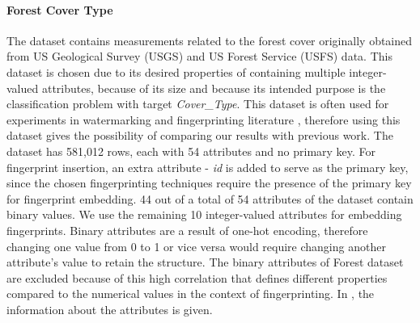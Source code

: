\paragraph{Forest Cover Type}
The dataset contains measurements related to the forest cover originally obtained from US Geological Survey (USGS) and US Forest Service (USFS) data.
This dataset is chosen due to its desired properties of containing multiple integer-valued attributes, because of its size and because its intended purpose is the classification problem with target \textit{Cover\_Type}. 
This dataset is often used for experiments in watermarking and fingerprinting literature \cite{agrawal2003watermarking,li2005fingerprinting}, therefore using this dataset gives the possibility of comparing our results with previous work.
The dataset has 581,012 rows, each with 54 attributes and no primary key. 
For fingerprint insertion, an extra attribute - \textit{id} is added to serve as the primary key, since the chosen fingerprinting techniques require the presence of the primary key for fingerprint embedding. 
44 out of a total of 54 attributes of the dataset contain binary values. 
We use the remaining 10 integer-valued attributes for embedding fingerprints.
Binary attributes are a result of one-hot encoding, therefore changing one value from 0 to 1 or vice versa would require changing another attribute's value to retain the structure. The binary attributes of Forest dataset are excluded because of this high correlation that defines different properties compared to the numerical values in the context of fingerprinting. 
In , the information about the attributes is given.

